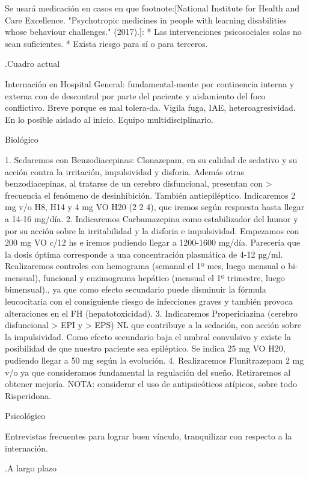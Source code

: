 Se usará medicación en casos en que footnote:[National Institute for Health and Care Excellence. "Psychotropic medicines in people with learning disabilities whose behaviour challenges." (2017).]:
* Las intervenciones psicosociales solas no sean suficientes.
* Exista riesgo para sí o para terceros.

.Cuadro actual

Internación en Hospital General: fundamental-mente por continencia interna y externa con de descontrol por parte del paciente y aislamiento del foco conflictivo. Breve porque es mal tolera-da. Vigila fuga, IAE, heteroagresividad. En lo posible aislado al inicio. Equipo multidisciplinario.

Biológico

1. Sedaremos con Benzodiacepinas: Clonazepam, en su calidad de sedativo y su acción contra la irritación, impulsividad y disforia. Además otras benzodiacepinas, al tratarse de un cerebro disfuncional, presentan con > frecuencia el fenómeno de desinhibición. También antiepiléptico. Indicaremos 2 mg v/o H8, H14 y 4 mg VO H20 (2 2 4), que iremos según respuesta hasta llegar a 14-16 mg/día.
2. Indicaremos Carbamazepina como estabilizador del humor y por su acción sobre la irritabilidad y la disforia e impulsividad. Empezamos con 200 mg VO c/12 hs e iremos pudiendo llegar a 1200-1600 mg/día. Parecería que la dosis óptima corresponde a una concentración plasmática de 4-12 µg/ml. Realizaremos controles con hemograma (semanal el 1º mes, luego mensual o bi-mensual), funcional y enzimograma hepático (mensual el 1º trimestre, luego bimensual)., ya que como efecto secundario puede disminuir la fórmula leucocitaria con el consiguiente riesgo de infecciones graves y también provoca alteraciones en el FH (hepatotoxicidad).
3. Indicaremos Propericiazina (cerebro disfuncional > EPI y > EPS) NL que contribuye a la sedación, con acción sobre la impulsividad. Como efecto secundario baja el umbral convulsivo y existe la posibilidad de que nuestro paciente sea epiléptico. Se indica 25 mg VO H20, pudiendo llegar a 50 mg según la evolución.
4. Realizaremos Flunitrazepam 2 mg v/o ya que consideramos fundamental la regulación del sueño. Retiraremos al obtener mejoría. NOTA: considerar el uso de antipsicóticos atípicos, sobre todo Risperidona.

Psicológico

Entrevistas frecuentes para lograr buen vínculo, tranquilizar con respecto a la internación.

.A largo plazo

